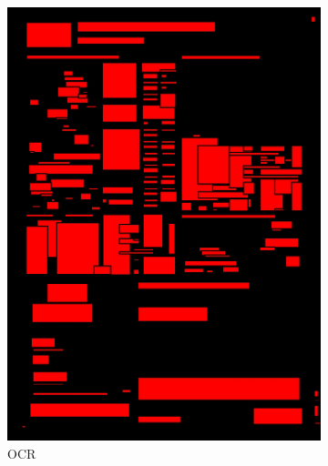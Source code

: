\documentclass[aspectratio=1610]{beamer}
\begin{document}
\begin{frame}
  \begin{figure}
\centering
\begin{subfigure}{.25\textwidth}
  \centering
  \includegraphics[width=0.99\linewidth, clip=true, trim = 0mm 0mm 0mm 0mm]{figures/ocr/Jd55Bvg.jpg}
  \caption{OCR}
\end{subfigure}%
\begin{subfigure}{.25\textwidth}
  \centering

\end{subfigure}
\end{figure}
\end{frame}
\end{document}
